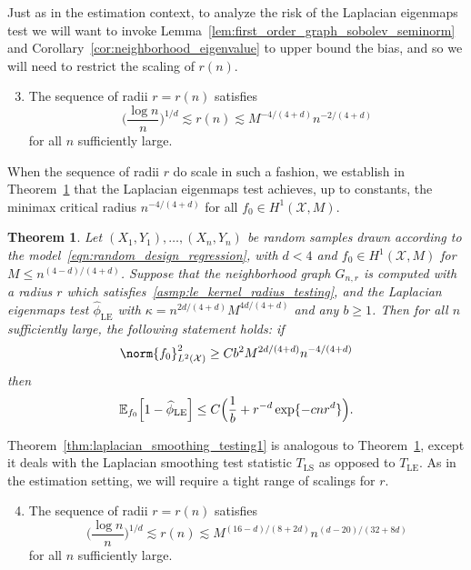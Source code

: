 \documentclass{article}
\newcommand{\1}{\mathbf{1}}
\newcommand{\Xset}{\mathcal{X}}
\newcommand{\Leb}{L}
\newcommand{\Ebb}{\mathbb{E}}
\newcommand{\wh}[1]{\widehat{#1}}
\newcommand{\LE}{\mathrm{LE}}
\newcommand{\LS}{\mathrm{LS}}
\theoremstyle{alden}
\theoremstyle{aldenthm}
\newtheorem{theorem}{Theorem}
\theoremstyle{definition}
\theoremstyle{remark}
\begin{document}
Just as in the estimation context, to analyze the risk of the Laplacian eigenmaps test we will want to invoke Lemma~\ref{lem:first_order_graph_sobolev_seminorm} and Corollary~\ref{cor:neighborhood_eigenvalue} to upper bound the bias, and so we will need to restrict the scaling of $r(n)$.
\begin{enumerate}[label=(R\arabic*)]
	\setcounter{enumi}{2}
	\item 
	\label{asmp:le_kernel_radius_testing}
	The sequence of radii $r = r(n)$ satisfies
	\begin{equation*}
	\biggl(\frac{\log n}{n}\biggr)^{1/d} \lesssim r(n) \lesssim M^{-4/(4 + d)}n^{-2/(4 + d)}
	\end{equation*}
	for all $n$ sufficiently large.
\end{enumerate}
When the sequence of radii $r$ do scale in such a fashion, we establish in Theorem~\ref{thm:laplacian_eigenmaps_testing1} that the Laplacian eigenmaps test achieves, up to constants, the minimax critical radius $n^{-4/(4 + d)}$ for all $f_0 \in H^1(\Xset,M)$.
\begin{theorem}
	\label{thm:laplacian_eigenmaps_testing1}
	Let $(X_1,Y_1),\ldots,(X_n,Y_n)$ be random samples drawn according to the model~\eqref{eqn:random_design_regression}, with $d < 4$ and $f_0 \in H^1(\Xset,M)$ for $M \leq n^{(4 - d)/(4 + d)}$. Suppose that the neighborhood graph $G_{n,r}$ is computed with a radius $r$ which satisfies~\ref{asmp:le_kernel_radius_testing}, and the Laplacian eigenmaps test $\wh{\phi}_{\LE}$ with $\kappa = n^{2d/(4 + d)} M^{4d/(4 + d)}$ and any $b \geq 1$. Then for all $n$ sufficiently large, the following statement holds: if
	\begin{equation}
	\label{eqn:laplacian_eigenmaps_testing1}
	\norm{f_0}_{\Leb^2(\Xset)}^2 \geq C b^2 M^{2d/(4 + d)} n^{-4/(4 + d)}
	\end{equation}
	then
	\begin{equation*}
	\Ebb_{f_0}\Bigl[1 - \wh{\phi}_{\LE}\Bigr] \leq C \Bigl(\frac{1}{b} + r^{-d} \exp\{- c n r^d\}\Bigr).
	\end{equation*}
\end{theorem}

Theorem~\ref{thm:laplacian_smoothing_testing1} is analogous to Theorem~\ref{thm:laplacian_eigenmaps_testing1}, except it deals with the Laplacian smoothing test statistic $T_{\LS}$ as opposed to $T_{\LE}$. As in the estimation setting, we will require a tight range of scalings for $r$.
\begin{enumerate}[label=(R\arabic*)]
	\setcounter{enumi}{3}
	\item 
	\label{asmp:ls_kernel_radius_testing}
	The sequence of radii $r = r(n)$ satisfies
	\begin{equation*}
	\biggl(\frac{\log n}{n}\biggr)^{1/d} \lesssim r(n) \lesssim M^{(16 - d)/(8 + 2d)}n^{(d - 20)/(32 + 8d)}
	\end{equation*}
	for all $n$ sufficiently large.
\end{enumerate}
\end{document}
